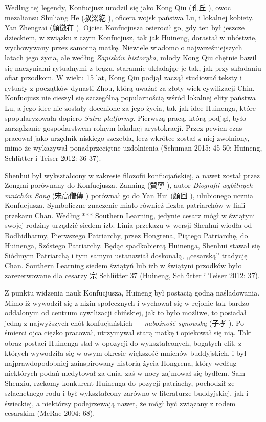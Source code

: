 Według tej legendy, Konfucjusz urodził się jako Kong Qiu (孔丘 ), owoc mezaliansu Shuliang He (叔梁紇 ), oficera wojsk państwa Lu, i lokalnej kobiety, Yan Zhengzai (顏徵在 ). Ojciec Konfucjusza osierocił go, gdy ten był jeszcze dzieckiem, w związku z czym Konfucjusz, tak jak Huineng, dorastał w ubóstwie, wychowywany przez samotną matkę. Niewiele wiadomo o najwcześniejszych latach jego życia, ale według \textit{Zapisków historyka}, młody Kong Qiu chętnie bawił się naczyniami rytualnymi z brązu, starannie układając je tak, jak przy składaniu ofiar przodkom. W wieku 15 lat, Kong Qiu podjął zaczął studiować teksty i rytuały z początków dynasti Zhou\fnm, którą uważał za złoty wiek cywilizacji Chin. Konfucjusz nie cieszył się szczególną popularnością wśród lokalnej elity państwa Lu, a jego idee nie zostały docenione za jego życia, tak jak idee Huinenga, które spopularyzowała dopiero \textit{Sutra platformy}. Pierwszą pracą, którą podjął, było zarządzanie gospodarstwem rolnym lokalnej arystokracji. Przez pewien czas pracował jako urzędnik niskiego szczebla, lecz wkrótce został z niej zwolniony, mimo że wykazywał ponadprzeciętne uzdolnienia (Schuman 2015: 45-50; Huineng, Schlütter i Teiser 2012: 36-37).%

Shenhui był wykształcony w zakresie filozofii konfucjańskiej, a nawet został przez Zongmi porównany do Konfucjusza. Zanning (贊寧 ), autor \textit{Biografii wybitnych mnichów Song} (宋高僧傳 ) porównał go do Yan Hui (顏回 ), ulubionego ucznia Konfucjusza.
Symboliczne znaczenie miało również liczba patriarchów w linii przekazu Chan. Według *** Southern Learning, jedynie cesarz mógł w świątyni swojej rodziny urządzić siedem izb. Linia przekazu w wersji Shenhui wiodła od Bodhidharmy, Pierwszego Patriarchy, przez Hongrena, Piątego Patriarchę, do Huinenga, Szóstego Patriarchy. Będąc spadkobiercą Huinenga, Shenhui stawał się Siódmym Patriarchą i tym samym ustanawiał doskonałą, ,,cesarską'' tradycję Chan.
Southern Learning
siedem świątyń lub izb w świątyni przodków było zarezerwowane dla cesarzy
宗
Schlütter 37 \fi
(Huineng, Schlütter i Teiser 2012: 37).

Z punktu widzenia nauk Konfucjusza, Huineng był postacią godną naśladowania. Mimo iż wywodził się z nizin społecznych i wychował się w rejonie tak bardzo oddalonym od centrum cywilizacji chińskiej, jak to było możliwe, to posiadał jedną z najwyższych cnót konfucjańskich --- \textit{nabożność synowską} (子孝 ). Po śmierci ojca ciężko pracował, utrzymywał starą matkę i opiekował się nią. Taki obraz postaci Huinenga stał w opozycji do wykształconych, bogatych elit, z których wywodziła się w owym okresie większość mnichów buddyjskich, i był najprawdopodobniej zainspirowany historią życia Hongrena, który według niektórych podań medytował za dnia, zaś w nocy zajmował się bydłem. Sam Shenxiu, rzekomy konkurent Huinenga do pozycji patriachy, pochodził ze szlachetnego rodu i był wykształcony zarówno w literaturze buddyjskiej, jak i świeckiej, a niektórzy podejrzewają nawet, że mógł być związany z rodem cesarskim (McRae 2004: 68).


